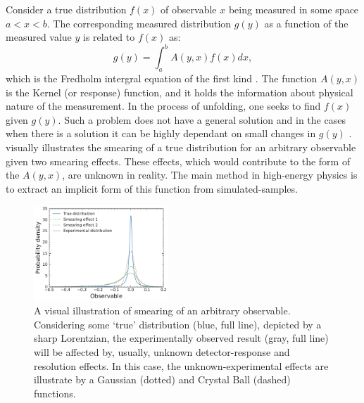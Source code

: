 Consider a true distribution $f(x)$ of observable $x$ being measured in some space $a<x<b$.
The corresponding measured distribution $g(y)$ as a function of the measured value $y$ is related to $f(x)$ as:
\begin{equation}\label{eq:fredholm_integral}
    g(y) =  \int_a^b A(y,x) f(x) dx,
\end{equation}
which is the Fredholm intergral equation of the first kind \cite{Blobel_Lohrmann_1998}.
The function $A(y, x)$ is the Kernel (or response) function, and it holds the information about physical nature of the measurement.
In the process of unfolding, one seeks to find $f(x)$ given $g(y)$.
Such a problem does not have a general solution and in the cases when there is a solution it can be highly dependant on small changes in $g(y)$ \cite{Delves_Walsh_1974}.
 visually illustrates the smearing of a true distribution for an arbitrary observable given two smearing effects.
These effects, which would contribute to the form of the $A(y,x)$, are unknown in reality.
The main method in high-energy physics is to extract an implicit form of this function from simulated-samples.

\begin{figure}[htbp!]
    \centering
\includegraphics[width=0.45\textwidth]{figures/analysis_techniques/experimental_smearing.pdf}
\caption{\label{fig:smearing_illustration} A visual illustration of smearing of an arbitrary observable.
Considering some `true' distribution (blue, full line), depicted by a sharp Lorentzian, the experimentally observed result (gray, full line) will be affected by, usually, unknown detector-response and resolution effects.
In this case, the unknown-experimental effects are illustrate by a Gaussian (dotted) and Crystal Ball (dashed) functions.}
\end{figure}

